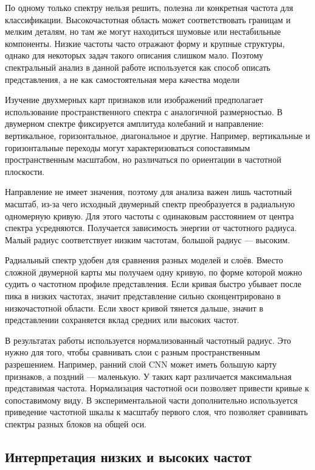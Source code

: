 По одному только спектру нельзя решить, полезна ли конкретная частота для классификации. Высокочастотная область может соответствовать границам и мелким деталям, но там же могут находиться шумовые или нестабильные компоненты. Низкие частоты часто отражают форму и крупные структуры, однако для некоторых задач такого описания слишком мало. Поэтому спектральный анализ в данной работе используется как способ описать представления, а не как самостоятельная мера качества модели

Изучение двухмерных карт признаков или изображений предполагает использование пространственного спектра с аналогичной размерностью. В двумерном спектре фиксируется амплитуда колебаний и направление: вертикальное, горизонтальное, диагональное и другие. Например, вертикальные и горизонтальные переходы могут характеризоваться сопоставимым пространственным масштабом, но различаться по ориентации в частотной плоскости. 

Направление не имеет значения, поэтому для анализа важен лишь частотный масштаб, из-за чего исходный двумерный спектр преобразуется в радиальную одномерную кривую. Для этого частоты с одинаковым расстоянием от центра спектра усредняются. Получается зависимость энергии от частотного радиуса. Малый радиус соответствует низким частотам, большой радиус — высоким.

Радиальный спектр удобен для сравнения разных моделей и слоёв. Вместо сложной двумерной карты мы получаем одну кривую, по форме которой можно судить о частотном профиле представления. Если кривая быстро убывает после пика в низких частотах, значит представление сильно сконцентрировано в низкочастотной области. Если хвост кривой тянется дальше, значит в представлении сохраняется вклад средних или высоких частот.

В результатах работы используется нормализованный частотный радиус. Это нужно для того, чтобы сравнивать слои с разным пространственным разрешением. Например, ранний слой CNN может иметь большую карту признаков, а поздний — маленькую. У таких карт различается максимальная представимая частота. Нормализация частотной оси позволяет привести кривые к сопоставимому виду. В экспериментальной части дополнительно используется приведение частотной шкалы к масштабу первого слоя, что позволяет сравнивать спектры разных блоков на общей оси.

\subsection{Интерпретация низких и высоких частот}

